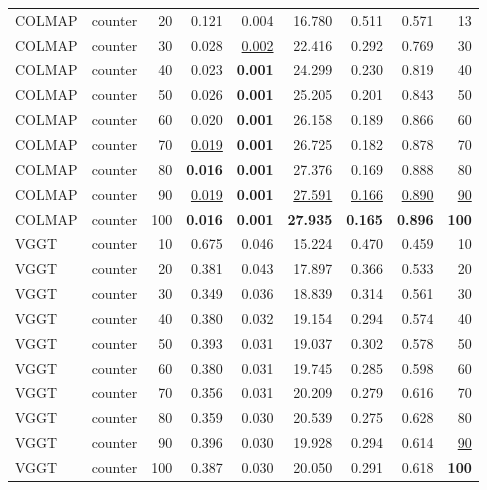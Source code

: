 \begin{table}[H]
\begin{tabular}{llrrrrrrr}
COLMAP & counter & 20 & 0.121 & 0.004 & 16.780 & 0.511 & 0.571 & 13 \\
COLMAP & counter & 30 & 0.028 & \underline{0.002} & 22.416 & 0.292 & 0.769 & 30 \\
COLMAP & counter & 40 & 0.023 & \textbf{0.001} & 24.299 & 0.230 & 0.819 & 40 \\
COLMAP & counter & 50 & 0.026 & \textbf{0.001} & 25.205 & 0.201 & 0.843 & 50 \\
COLMAP & counter & 60 & 0.020 & \textbf{0.001} & 26.158 & 0.189 & 0.866 & 60 \\
COLMAP & counter & 70 & \underline{0.019} & \textbf{0.001} & 26.725 & 0.182 & 0.878 & 70 \\
COLMAP & counter & 80 & \textbf{0.016} & \textbf{0.001} & 27.376 & 0.169 & 0.888 & 80 \\
COLMAP & counter & 90 & \underline{0.019} & \textbf{0.001} & \underline{27.591} & \underline{0.166} & \underline{0.890} & \underline{90} \\
COLMAP & counter & 100 & \textbf{0.016} & \textbf{0.001} & \textbf{27.935} & \textbf{0.165} & \textbf{0.896} & \textbf{100} \\
VGGT & counter & 10 & 0.675 & 0.046 & 15.224 & 0.470 & 0.459 & 10 \\
VGGT & counter & 20 & 0.381 & 0.043 & 17.897 & 0.366 & 0.533 & 20 \\
VGGT & counter & 30 & 0.349 & 0.036 & 18.839 & 0.314 & 0.561 & 30 \\
VGGT & counter & 40 & 0.380 & 0.032 & 19.154 & 0.294 & 0.574 & 40 \\
VGGT & counter & 50 & 0.393 & 0.031 & 19.037 & 0.302 & 0.578 & 50 \\
VGGT & counter & 60 & 0.380 & 0.031 & 19.745 & 0.285 & 0.598 & 60 \\
VGGT & counter & 70 & 0.356 & 0.031 & 20.209 & 0.279 & 0.616 & 70 \\
VGGT & counter & 80 & 0.359 & 0.030 & 20.539 & 0.275 & 0.628 & 80 \\
VGGT & counter & 90 & 0.396 & 0.030 & 19.928 & 0.294 & 0.614 & \underline{90} \\
VGGT & counter & 100 & 0.387 & 0.030 & 20.050 & 0.291 & 0.618 & \textbf{100} \\
\bottomrule
\end{tabular}
\end{table}